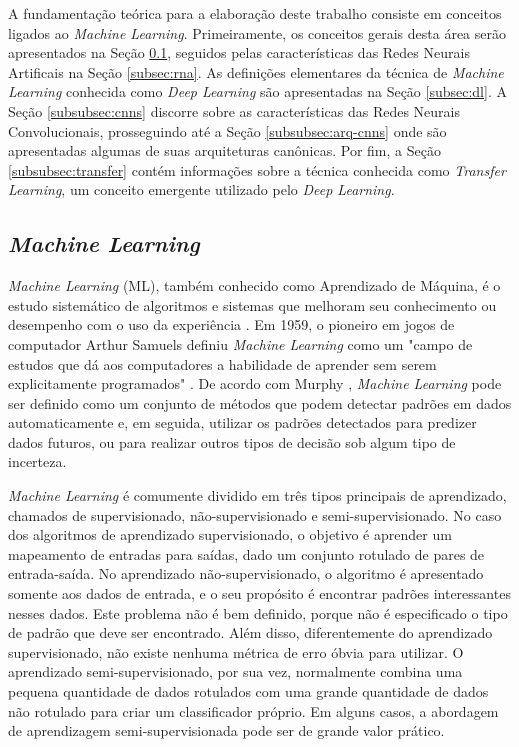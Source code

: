 A fundamentação teórica para a elaboração deste trabalho consiste em conceitos ligados ao \emph{Machine Learning}. Primeiramente, os conceitos gerais desta área serão apresentados na Seção \ref{subsec:ml}, seguidos pelas características das Redes Neurais Artificais na Seção \ref{subsec:rna}. As definições elementares da técnica de \emph{Machine Learning} conhecida como \emph{Deep Learning} são apresentadas na Seção \ref{subsec:dl}. A Seção \ref{subsubsec:cnns} discorre sobre as características das Redes Neurais Convolucionais, prosseguindo até a Seção \ref{subsubsec:arq-cnns} onde são apresentadas algumas de suas arquiteturas canônicas. Por fim, a Seção \ref{subsubsec:transfer} contém informações sobre a técnica conhecida como \emph{Transfer Learning}, um conceito emergente utilizado pelo \emph{Deep Learning}.


\subsection{\emph{Machine Learning}}
\label{subsec:ml}

\emph{Machine Learning} (ML), também conhecido como Aprendizado de Máquina, é o estudo sistemático de algoritmos e sistemas que melhoram seu conhecimento ou desempenho com o uso da experiência \cite{flach}. Em 1959, o pioneiro em jogos de computador Arthur Samuels definiu \emph{Machine Learning} como um "campo de estudos que dá aos computadores a habilidade de aprender sem serem explicitamente programados" \cite{simon}. De acordo com Murphy \cite{murphy} , \emph{Machine Learning} pode ser definido como um conjunto de métodos que podem detectar padrões em dados automaticamente e, em seguida, utilizar os padrões detectados para predizer dados futuros, ou para realizar outros tipos de decisão sob algum tipo de incerteza.

\emph{Machine Learning} é comumente dividido em três tipos principais de aprendizado, chamados de supervisionado, não-supervisionado e semi-supervisionado. No caso dos algoritmos de aprendizado supervisionado, o objetivo é aprender um mapeamento de entradas para saídas, dado um conjunto rotulado de pares de entrada-saída. No aprendizado não-supervisionado, o algoritmo é apresentado somente aos dados de entrada, e o seu propósito é encontrar padrões interessantes nesses dados. Este problema não é bem definido, porque não é especificado o tipo de padrão que deve ser encontrado. Além disso, diferentemente do aprendizado supervisionado, não existe nenhuma métrica de erro óbvia para utilizar. O aprendizado semi-supervisionado, por sua vez, normalmente combina uma pequena quantidade de dados rotulados com uma grande quantidade de dados não rotulado para criar um classificador próprio. Em alguns casos, a abordagem de aprendizagem semi-supervisionada pode ser de grande valor prático. \cite{khan}

